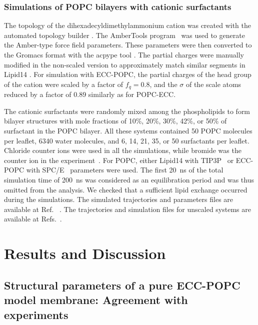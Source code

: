 \documentclass[journal=jpcbfk,manuscript=article]{achemso}
\begin{document}
\subsubsection{Simulations of POPC bilayers with cationic surfactants}
The topology of the dihexadecyldimethylammonium cation was created with the automated topology builder \cite{malde11}. The AmberTools program~\cite{amber} was used to generate the Amber-type force field parameters. These parameters were then converted to the Gromacs format with the acpype tool \cite{acpype}. The partial charges were manually modified in the non-scaled version to approximately match similar segments in Lipid14 \cite{dickson14}. For simulation with ECC-POPC, the partial charges of the head group of the cation were scaled by a factor of $f_q=0.8$, and the $\sigma$ of the scale atoms reduced by a factor of 0.89 similarly as for POPC-ECC.

The cationic surfactants were randomly mixed among the phospholipids to form bilayer structures with mole fractions of 10\%, 20\%, 30\%, 42\%, or 50\% of surfactant in the POPC bilayer. All these systems contained 50 POPC molecules per leaflet, 6340 water molecules, and 6, 14, 21, 35, or 50 surfactants per leaflet.  Chloride counter ions were used in all the simulations, while bromide was the counter ion in the experiment~\cite{scherer89}. For POPC, either Lipid14 with TIP3P~\cite{jorgensen83} or ECC-POPC with SPC/E~\cite{Berendsen1987} parameters  were used. The first 20~ns of the total simulation time of 200~ns was considered as an equilibration period and was thus omitted from the analysis. We checked that a sufficient lipid  exchange occurred during the simulations.
The simulated trajectories and parameters files are available at Ref.~ 
.
The trajectories and simulation files for unscaled systems are available at
Refs.~.

\section{Results and Discussion}

\subsection{Structural parameters of a pure ECC-POPC model membrane: Agreement with experiments}
\end{document}
